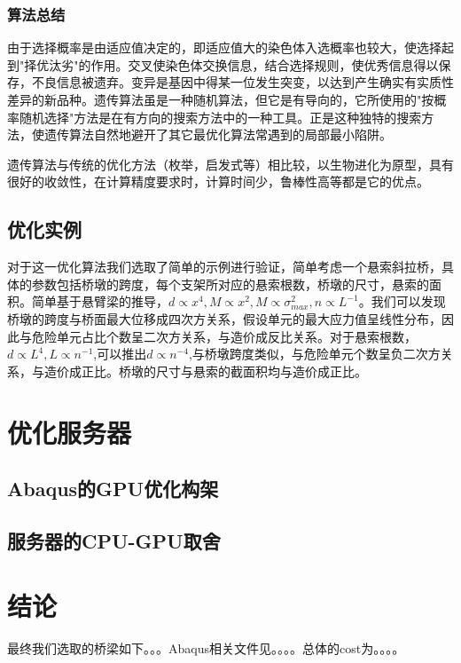 \documentclass[forprint]{WHUBachelor}
\begin{document}
\subsection{算法总结}
由于选择概率是由适应值决定的，即适应值大的染色体入选概率也较大，使选择起到"择优汰劣"的作用。交叉使染色体交换信息，结合选择规则，使优秀信息得以保存，不良信息被遗弃。变异是基因中得某一位发生突变，以达到产生确实有实质性差异的新品种。遗传算法虽是一种随机算法，但它是有导向的，它所使用的"按概率随机选择"方法是在有方向的搜索方法中的一种工具。正是这种独特的搜索方法，使遗传算法自然地避开了其它最优化算法常遇到的局部最小陷阱。\par
遗传算法与传统的优化方法（枚举，启发式等）相比较，以生物进化为原型，具有很好的收敛性，在计算精度要求时，计算时间少，鲁棒性高等都是它的优点。
\section{优化实例}
对于这一优化算法我们选取了简单的示例进行验证，简单考虑一个悬索斜拉桥，具体的参数包括桥墩的跨度，每个支架所对应的悬索根数，桥墩的尺寸，悬索的面积。简单基于悬臂梁的推导，$d\propto x^4,M\propto x^2,M\propto \sigma_{max}^2,n \propto L^{-1}$。我们可以发现桥墩的跨度与桥面最大位移成四次方关系，假设单元的最大应力值呈线性分布，因此与危险单元占比个数呈二次方关系，与造价成反比关系。对于悬索根数，$d \propto L^4,L \propto n^{-1}$,可以推出$d \propto n^{-4}$,与桥墩跨度类似，与危险单元个数呈负二次方关系，与造价成正比。桥墩的尺寸与悬索的截面积均与造价成正比。

\chapter{优化服务器}
\section{Abaqus的GPU优化构架}
\section{服务器的CPU-GPU取舍}
\chapter{结论}
最终我们选取的桥梁如下。。。Abaqus相关文件见。。。。总体的cost为。。。。


\cleardoublepage
\end{document}
